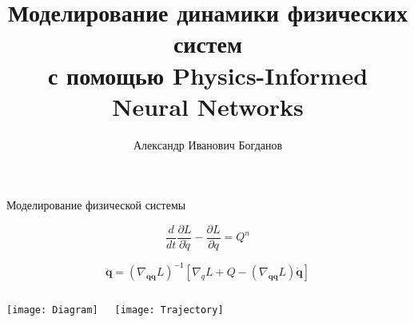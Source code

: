 \documentclass{beamer}
\title[\hbox to 56mm{Моделирование динамики физических систем}]{Моделирование динамики физических систем\\ с помощью Physics-Informed Neural Networks}
\author[А.\,И.~Богданов]{Александр Иванович Богданов}
\institute{Московский физико-технический институт}
\date{\footnotesize
\par\smallskip\emph{Курс:} Моя первая научная статья
\par\smallskip\emph{Консультант:} К.\,К.~Панченко
\par\bigskip\small 2023}
\begin{document}

\begin{frame}

    \thispagestyle{empty}
    \maketitle
    
\end{frame}


\begin{comment}
\begin{frame}{Цель исследования}
\end{frame}
\end{comment}


\begin{frame}{Моделирование физической системы}

    $$\frac{d}{dt} \frac{\partial L}{\partial \dot{q}} - \frac{\partial L}{\partial q} = Q^n$$
    
    $$\mathbf{\ddot{q}} = \left( \nabla_{\dot{\mathbf{q}} \dot{\mathbf{q}}} L\right)^{-1} \left[ \nabla_{q} L + Q - \left( \nabla_{\dot{\mathbf{q}} \mathbf{q}} L \right) \dot{\mathbf{q}} \right]$$

    \bigskip

    \begin{columns}[c]

            \texttt{[image: Diagram]}

            \texttt{[image: Trajectory]} 
            
    \end{columns}

\end{frame}
\end{document}

